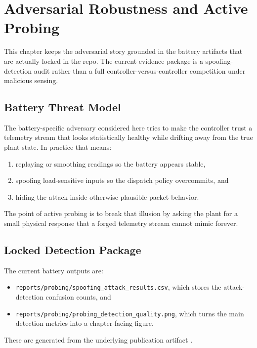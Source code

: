 \chapter{Adversarial Robustness and Active Probing}
\label{ch:adversarial-robustness}

This chapter keeps the adversarial story grounded in the battery artifacts
that are actually locked in the repo.  The current evidence package is a
spoofing-detection audit rather than a full controller-versus-controller
competition under malicious sensing.

\section{Battery Threat Model}

The battery-specific adversary considered here tries to make the controller
trust a telemetry stream that looks statistically healthy while drifting away
from the true plant state.  In practice that means:

\begin{enumerate}
  \item replaying or smoothing readings so the battery appears stable,
  \item spoofing load-sensitive inputs so the dispatch policy overcommits, and
  \item hiding the attack inside otherwise plausible packet behavior.
\end{enumerate}

The point of active probing is to break that illusion by asking the plant for
a small physical response that a forged telemetry stream cannot mimic forever.

\section{Locked Detection Package}

The current battery outputs are:

\begin{itemize}
  \item \texttt{reports/probing/spoofing\_attack\_results.csv}, which stores
    the attack-detection confusion counts, and
  \item \texttt{reports/probing/probing\_detection\_quality.png}, which turns
    the main detection metrics into a chapter-facing figure.
\end{itemize}

These are generated from the underlying publication artifact
.

